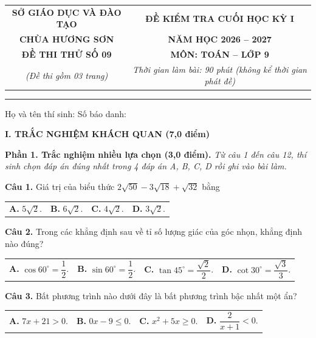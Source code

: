 \documentclass[11pt,a4paper]{article}
\begin{document}
\noindent
\begin{tabular*}{\linewidth}{@{\extracolsep{\fill}}cc@{}}
\textbf{SỞ GIÁO DỤC VÀ ĐÀO TẠO} & \textbf{ĐỀ KIỂM TRA CUỐI HỌC KỲ I} \\
\textbf{CHÙA HƯƠNG SƠN} & \textbf{NĂM HỌC 2026 -- 2027} \\
\textbf{ĐỀ THI THỬ SỐ 09} & \textbf{MÔN: TOÁN -- LỚP 9} \\
\textit{(Đề thi gồm 03 trang)} & \textit{Thời gian làm bài: 90 phút (không kể thời gian phát đề)} \\
\end{tabular*}

\vspace{2mm}
\noindent
\rule{\linewidth}{0.8pt}

\vspace{1mm}
\noindent
Họ và tên thí sinh: \dotfill Số báo danh: \dotfill

\vspace{2mm}
\noindent
\textbf{\large I. TRẮC NGHIỆM KHÁCH QUAN (7,0 điểm)}

\vspace{1mm}
\noindent
\textbf{Phần 1. Trắc nghiệm nhiều lựa chọn (3,0 điểm).} \textit{Từ câu 1 đến câu 12, thí sinh chọn đáp án đúng nhất trong 4 đáp án A, B, C, D rồi ghi vào bài làm.}

\vspace{1.5mm}
\textbf{Câu 1.} Giá trị của biểu thức $2\sqrt{50} - 3\sqrt{18} + \sqrt{32}$ bằng\\
\begin{tabularx}{\linewidth}{XXXX}
\textbf{A.} $5\sqrt{2}$. & \textbf{B.} $6\sqrt{2}$. & \textbf{C.} $4\sqrt{2}$. & \textbf{D.} $3\sqrt{2}$.
\end{tabularx}

\vspace{1.5mm}
\textbf{Câu 2.} Trong các khẳng định sau về tỉ số lượng giác của góc nhọn, khẳng định nào đúng?\\
\begin{tabularx}{\linewidth}{XXXX}
\textbf{A.} $\cos 60^\circ = \dfrac{1}{2}$. & \textbf{B.} $\sin 60^\circ = \dfrac{1}{2}$. & \textbf{C.} $\tan 45^\circ = \dfrac{\sqrt{2}}{2}$. & \textbf{D.} $\cot 30^\circ = \dfrac{\sqrt{3}}{3}$.
\end{tabularx}

\vspace{1.5mm}
\textbf{Câu 3.} Bất phương trình nào dưới đây là bất phương trình bậc nhất một ẩn?\\
\begin{tabularx}{\linewidth}{XXXX}
\textbf{A.} $7x + 21 > 0$. & \textbf{B.} $0x - 9 \le 0$. & \textbf{C.} $x^2 + 5x \ge 0$. & \textbf{D.} $\dfrac{2}{x+1} < 0$.
\end{tabularx}
\end{document}
